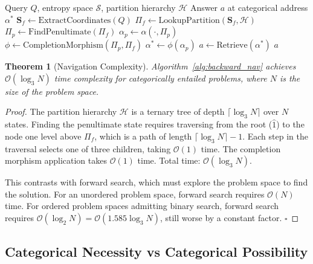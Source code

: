 \documentclass[12pt,twocolumn]{article}
\newtheorem{theorem}{Theorem}[section]
\begin{document}
\begin{algorithm}[H]
\caption{Backward Trajectory Completion}
\label{alg:backward_nav}
\begin{algorithmic}[1]
\Require Query $Q$, entropy space $\mathcal{S}$, partition hierarchy $\mathcal{H}$
\Ensure Answer $a$ at categorical address $\alpha^*$
\State $\mathbf{S}_f \leftarrow \text{ExtractCoordinates}(Q)$
\State $\Pi_f \leftarrow \text{LookupPartition}(\mathbf{S}_f, \mathcal{H})$
\State $\Pi_p \leftarrow \text{FindPenultimate}(\Pi_f)$ 
\State $\alpha_p \leftarrow \alpha(\cdot, \Pi_p)$ 
\State $\phi \leftarrow \text{CompletionMorphism}(\Pi_p, \Pi_f)$
\State $\alpha^* \leftarrow \phi(\alpha_p)$ 
\State $a \leftarrow \text{Retrieve}(\alpha^*)$
\Return $a$
\end{algorithmic}
\end{algorithm}

\begin{theorem}[Navigation Complexity]
\label{thm:complexity}
Algorithm~\ref{alg:backward_nav} achieves $\mathcal{O}(\log_3 N)$ time complexity for categorically entailed problems, where $N$ is the size of the problem space.
\end{theorem}

\begin{proof}
The partition hierarchy $\mathcal{H}$ is a ternary tree of depth $\lceil \log_3 N \rceil$ over $N$ states. Finding the penultimate state requires traversing from the root ($\hat{1}$) to the node one level above $\Pi_f$, which is a path of length $\lceil \log_3 N \rceil - 1$. Each step in the traversal selects one of three children, taking $\mathcal{O}(1)$ time. The completion morphism application takes $\mathcal{O}(1)$ time. Total time: $\mathcal{O}(\log_3 N)$.

This contrasts with forward search, which must explore the problem space to find the solution. For an unordered problem space, forward search requires $\mathcal{O}(N)$ time. For ordered problem spaces admitting binary search, forward search requires $\mathcal{O}(\log_2 N) = \mathcal{O}(1.585 \log_3 N)$, still worse by a constant factor. $\square$
\end{proof}

\subsection{Categorical Necessity vs Categorical Possibility}
\end{document}

